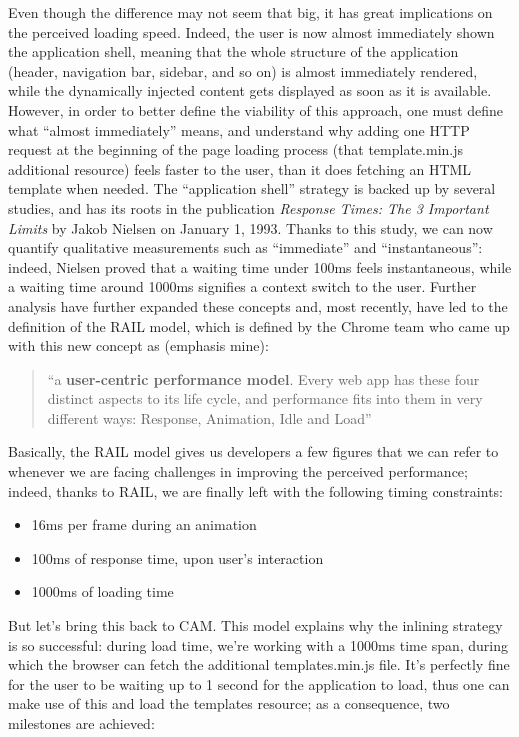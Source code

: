 \documentclass[12pt,svgnames]{memoir}
\newenvironment{quotationb}%
{\color{maincolor}\begin{leftbar}\begin{quotation}}%
{\end{quotation}\end{leftbar}\ignorespacesafterend}
\begin{document}
Even though the difference may not seem that big, it has great
implications on the perceived loading speed. Indeed, the user is now
almost immediately shown the application shell, meaning that the whole
structure of the application (header, navigation bar, sidebar, and so
on) is almost immediately rendered, while the dynamically injected
content gets displayed as soon as it is available. However, in order to
better define the viability of this approach, one must define what
``almost immediately'' means, and understand why adding one HTTP request
at the beginning of the page loading process (that template.min.js
additional resource) feels faster to the user, than it does fetching an
HTML template when needed. The ``application shell'' strategy is backed
up by several studies, and has its roots in the publication
\emph{Response Times: The 3 Important Limits} by Jakob Nielsen on
January 1, 1993. Thanks to this study, we can now quantify qualitative
measurements such as ``immediate'' and ``instantaneous'': indeed,
Nielsen proved that a waiting time under 100ms feels instantaneous,
while a waiting time around 1000ms signifies a context switch to the
user. Further analysis have further expanded these concepts and, most
recently, have led to the definition of the RAIL model, which is defined
by the Chrome team who came up with this new concept as (emphasis mine):

\begin{quotationb}
``a \textbf{user-centric performance model}. Every web app has these
four distinct aspects to its life cycle, and performance fits into them
in very different ways: Response, Animation, Idle and Load''
\end{quotationb}

Basically, the RAIL model gives us developers a few figures that we can
refer to whenever we are facing challenges in improving the perceived
performance; indeed, thanks to RAIL, we are finally left with the
following timing constraints:

\begin{itemize}
\itemsep1pt\parskip0pt
\item
  16ms per frame during an animation
\item
  100ms of response time, upon user's interaction
\item
  1000ms of loading time
\end{itemize}

But let's bring this back to CAM. This model explains why the inlining
strategy is so successful: during load time, we're working with a 1000ms
time span, during which the browser can fetch the additional
templates.min.js file. It's perfectly fine for the user to be waiting up
to 1 second for the application to load, thus one can make use of this
and load the templates resource; as a consequence, two milestones are
achieved:
\end{document}
